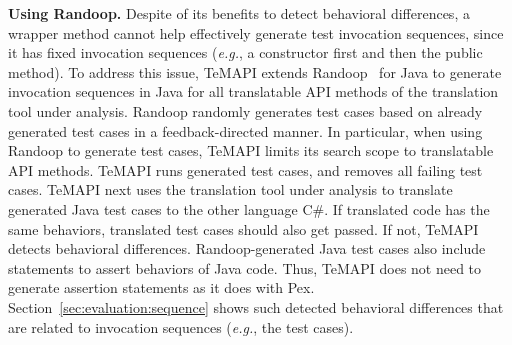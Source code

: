 \textbf{Using Randoop.} Despite of its benefits to detect behavioral differences, a wrapper method cannot help effectively generate test invocation sequences, since it has fixed invocation sequences (\emph{e.g.}, a constructor first and then the public method). To address this issue, TeMAPI extends Randoop~\cite{pacheco2007feedback} for Java to generate invocation sequences in Java for all translatable API methods of the translation tool under analysis. Randoop randomly generates test cases based on already generated test cases in a feedback-directed manner. In particular, when using Randoop to generate test cases, TeMAPI limits its search scope to translatable API methods. TeMAPI runs generated test cases, and removes all failing test cases. TeMAPI next uses the translation tool under analysis to translate generated Java test cases to the other language C\#. If translated code has the same behaviors, translated test cases should also get passed. If not, TeMAPI detects behavioral differences. Randoop-generated Java test cases also include  statements to assert behaviors of Java code. Thus, TeMAPI does not need to generate assertion statements as it does with Pex. Section~\ref{sec:evaluation:sequence} shows such detected behavioral differences that are related to invocation sequences (\emph{e.g.}, the  test cases).


